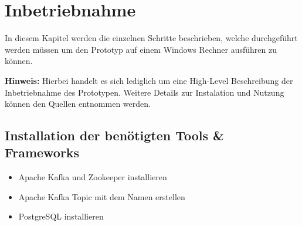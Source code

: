 \chapter{Inbetriebnahme}
\label{chap:betrieb}
In diesem Kapitel werden die einzelnen Schritte beschrieben, welche durchgeführt werden müssen um den Prototyp auf einem Windows Rechner ausführen zu können.

\textbf{Hinweis:}
\newline
Hierbei handelt es sich lediglich um eine High-Level Beschreibung der Inbetriebnahme des Prototypen.
Weitere Details zur Instalation und Nutzung können den Quellen entnommen werden.
\newline

\section{Installation der benötigten Tools \& Frameworks}
\begin{itemize}
  \item Apache Kafka und Zookeeper installieren\autocite{Kafka}
  \item Apache Kafka Topic mit dem Namen  erstellen\autocite{KafkaTopic}
  \item PostgreSQL installieren\autocite{PostgreSQL}
\end{itemize}

